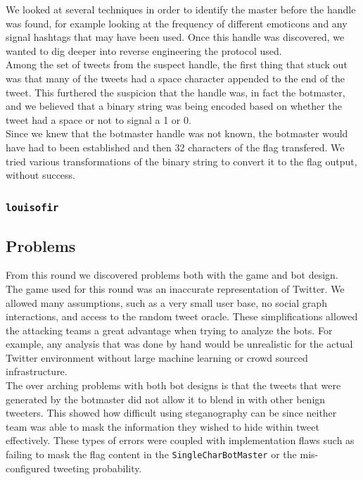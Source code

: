 \documentclass[11pt, oneside]{article} %
\numberwithin{equation}{section} %
\numberwithin{figure}{section} %
\numberwithin{table}{section} %
\renewcommand{\c}[1]{\texttt{#1}}
\newcommand{\teamol}{\c{louisofir}}
\begin{document}
			We looked at several techniques in order to identify the master before the handle was found, for example looking at the frequency of different emoticons and any signal hashtags that may have been used. Once this handle was discovered, we wanted to dig deeper into reverse engineering the protocol used. \\

			Among the set of tweets from the suspect handle, the first thing that stuck out was that many of the tweets had a space character appended to the end of the tweet. This furthered the suspicion that the handle was, in fact the botmaster, and we believed that a binary string was being encoded based on whether the tweet had a space or not to signal a 1 or 0. \\

			Since we knew that the botmaster handle was not known, the botmaster would have had to been established and then 32 characters of the flag transfered. We tried various transformations of the binary string to convert it to the flag output, without success. 

		\subsubsection{\teamol}

	\subsection{Problems}
		From this round we discovered problems both with the game and bot design. \\

		The game used for this round was an inaccurate representation of Twitter. We allowed many assumptions, such as a very small user base, no social graph interactions, and access to the random tweet oracle. These simplifications allowed the attacking teams a great advantage when trying to analyze the bots. For example, any analysis that was done by hand would be unrealistic for the actual Twitter environment without large machine learning or crowd sourced infrastructure. \\ 
		
		The over arching problems with both bot designs is that the tweets that were generated by the botmaster did not allow it to blend in with other benign tweeters. This showed how difficult using steganography can be since neither team was able to mask the information they wished to hide within tweet effectively.  These types of errors were coupled with implementation flaws such as failing to mask the flag content in the \c{SingleCharBotMaster} or the mis-configured tweeting probability. \\
\end{document}
